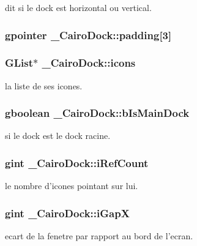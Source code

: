 dit si le dock est horizontal ou vertical. 

\subsubsection{\setlength{\rightskip}{0pt plus 5cm}gpointer {\bf \_\-CairoDock::padding}[3]}\label{struct__CairoDock_ee5c36bf971747e251769ebd7326a730}


\subsubsection{\setlength{\rightskip}{0pt plus 5cm}GList$\ast$ {\bf \_\-CairoDock::icons}}\label{struct__CairoDock_70a1f2c47eccc9f9180688dc4a3542ee}


la liste de ses icones. 

\subsubsection{\setlength{\rightskip}{0pt plus 5cm}gboolean {\bf \_\-CairoDock::bIsMainDock}}\label{struct__CairoDock_dac8dc2d21b68aa1ca0d7e9c5b54faab}


si le dock est le dock racine. 

\subsubsection{\setlength{\rightskip}{0pt plus 5cm}gint {\bf \_\-CairoDock::iRefCount}}\label{struct__CairoDock_c72e0961fae689058dbb526e8a334c65}


le nombre d'icones pointant sur lui. 

\subsubsection{\setlength{\rightskip}{0pt plus 5cm}gint {\bf \_\-CairoDock::iGapX}}\label{struct__CairoDock_9924de20e5ef76f8cad3011d1c883544}


ecart de la fenetre par rapport au bord de l'ecran. 

